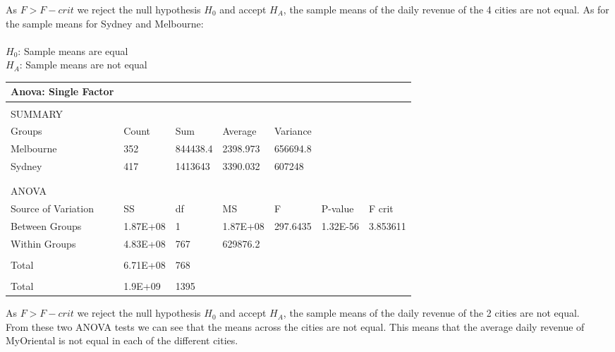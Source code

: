 \documentclass[11pt]{article}
\begin{document}
As $F > F-crit$ we reject the null hypothesis $H_0$ and accept $H_A$, the sample means of the daily revenue of the 4 cities are not equal.
\newpage As for the sample means for Sydney and Melbourne:\\ \\
$H_0$: Sample means are equal\\
$H_A$: Sample means are not equal\\

\begin{table}[h]
\begin{tabular}{@{}lllllll@{}}
\toprule
Anova: Single   Factor &          &          &          &          &          &          \\ \midrule
                       &          &          &          &          &          &          \\
SUMMARY                &          &          &          &          &          &          \\
Groups                 & Count    & Sum      & Average  & Variance &          &          \\
Melbourne               & 352      & 844438.4 & 2398.973 & 656694.8 &          &          \\
Sydney               & 417      & 1413643  & 3390.032 & 607248   &          &          \\
                       &          &          &          &          &          &          \\
                       &          &          &          &          &          &          \\ \midrule
ANOVA                  &          &          &          &          &          &          \\ \midrule
Source of Variation    & SS       & df       & MS       & F        & P-value  & F crit   \\
Between Groups         & 1.87E+08 & 1        & 1.87E+08 & 297.6435 & 1.32E-56 & 3.853611 \\
Within Groups          & 4.83E+08 & 767      & 629876.2 &          &          &          \\
                       &          &          &          &          &          &          \\
Total                  & 6.71E+08 & 768      &          &          &          &          \\
                       &          &          &          &          &          &          \\
Total                  & 1.9E+09  & 1395     &          &          &          &          \\ \bottomrule
\end{tabular}
\end{table}
As $F > F-crit$ we reject the null hypothesis $H_0$ and accept $H_A$, the sample means of the daily revenue of the 2 cities are not equal.\\

From these two ANOVA tests we can see that the means across the cities are not equal. This means that the average daily revenue of MyOriental is not equal in each of the different cities.
\end{document}
